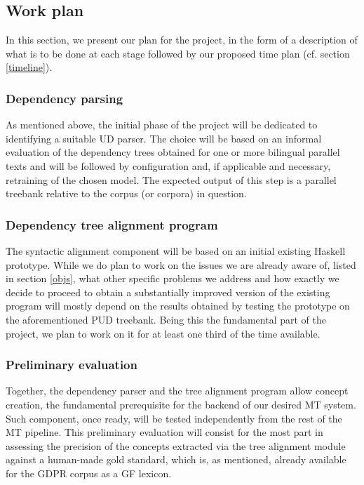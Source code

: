\documentclass{article}
\begin{document}
\subsection{Work plan} %
In this section, we present our plan for the project, in the form of a description of what is to be done at each stage followed by our proposed time plan (cf. section \ref{timeline}).

\subsubsection{Dependency parsing}
As mentioned above, the initial phase of the project will be dedicated to identifying a suitable UD parser. The choice will be based on an informal evaluation of the dependency trees obtained for one or more bilingual parallel texts and will be followed by configuration and, if applicable and necessary, retraining of the chosen model.
The expected output of this step is a parallel treebank relative to the corpus (or corpora) in question.

\subsubsection{Dependency tree alignment program} %
The syntactic alignment component will be based on an initial existing Haskell prototype. 
While we do plan to work on the issues we are already aware of, listed in section \ref{objs}, what other specific problems we address and how exactly we decide to proceed to obtain a substantially improved version of the existing program will mostly depend on the results obtained by testing the prototype on the aforementioned PUD treebank.
Being this the fundamental part of the project, we plan to work on it for at least one third of the time available.

\subsubsection{Preliminary evaluation} \label{prelev}
Together, the dependency parser and the tree alignment program allow concept creation, the fundamental prerequisite for the backend of our desired MT system. Such component, once ready, will be tested independently from the rest of the MT pipeline. This preliminary evaluation will consist for the most part in assessing the precision of the concepts extracted via the tree alignment module against a human-made gold standard, which is, as mentioned, already available for the GDPR corpus as a GF lexicon. 
\end{document}
